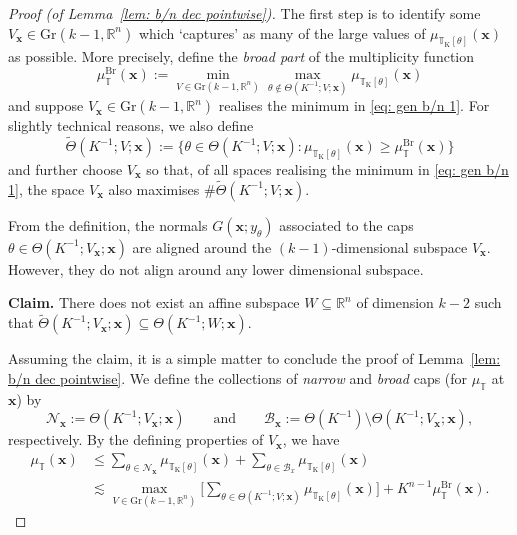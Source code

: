 \documentclass[10pt,a4paper]{amsart}
\newcommand{\R}{\mathbb{R}}
\newcommand{\T}{\mathbb{T}}
\newcommand{\bx}{\mathbf{x}}
\newcommand{\cB}{\mathcal{B}}
\begin{document}
\begin{proof}[Proof (of Lemma~\ref{lem: b/n dec pointwise})] The first step is to identify some $V_{\bx} \in \mathrm{Gr}(k-1,\R^n)$ which `captures' as many of the large values of $\mu_{\T_{\mathrm{K}}[\theta]}(\bx)$ as possible. More precisely, define the \textit{broad part} of the multiplicity function
\begin{equation}\label{eq: gen b/n 1} 
    \mu_{\T}^{\mathrm{Br}}(\bx) := \min_{V \in \mathrm{Gr}(k-1,\R^n)} \max_{\theta \notin \Theta(K^{-1}; V; \bx)} \mu_{\T_{\mathrm{K}}[\theta]}(\bx)
\end{equation}
and suppose $V_{\bx} \in \mathrm{Gr}(k-1,\R^n)$ realises the minimum in \eqref{eq: gen b/n 1}. For slightly technical reasons, we also define 
\begin{equation}\label{eq: gen b/n 2} 
    \widetilde{\Theta}(K^{-1}; V; \bx) := \big\{ \theta \in \Theta(K^{-1}; V; \bx) : \mu_{\T_{\mathrm{K}}[\theta]}(\bx) \geq \mu_{\T}^{\mathrm{Br}}(\bx) \big\}
\end{equation}
and further choose $V_{\bx}$ so that, of all spaces realising the minimum in \eqref{eq: gen b/n 1}, the space $V_{\bx}$ also maximises $\#\widetilde{\Theta}(K^{-1}; V; \bx)$. 

From the definition, the normals $G(\bx;y_{\theta})$ associated to the caps $\theta \in \Theta(K^{-1}; V_{\bx}; \bx)$ are aligned around the $(k-1)$-dimensional subspace $V_{\bx}$. However, they do not align around any lower dimensional subspace. \medskip

\noindent \textbf{Claim.} There does not exist an affine subspace $W \subseteq \R^n$ of dimension $k-2$ such that $\widetilde{\Theta}(K^{-1}; V_{\bx}; \bx) \subseteq \Theta(K^{-1}; W; \bx)$. \medskip

Assuming the claim, it is a simple matter to conclude the proof of Lemma~\ref{lem: b/n dec pointwise}. We define the collections of \textit{narrow} and \textit{broad} caps (for $\mu_{\T}$ at $\bx$) by
\begin{equation*}
    \mathcal{N}_{\bx} := \Theta(K^{-1}; V_{\bx}; \bx) \qquad \textrm{and} \qquad  \cB_{\bx} := \Theta(K^{-1}) \setminus \Theta(K^{-1}; V_{\bx}; \bx),
\end{equation*}
respectively. By the defining properties of $V_{\bx}$, we have
\begin{align*}
    \mu_{\T}(\bx) &\leq  \sum_{\theta \in \mathcal{N}_{\bx}} \mu_{\T_{\mathrm{K}}[\theta]}(\bx)  + \sum_{\theta \in \cB_x} \mu_{\T_{\mathrm{K}}[\theta]}(\bx)  \\
    &\lesssim \max_{V \in \mathrm{Gr}(k-1,\R^n)} \Big[ \sum_{\theta \in \Theta(K^{-1}; V; \bx)} \mu_{\T_{\mathrm{K}}[\theta]}(\bx) \Big]  + 
 K^{n-1} \mu_{\T}^{\mathrm{Br}}(\bx).   
\end{align*}


\end{proof}
\end{document}
